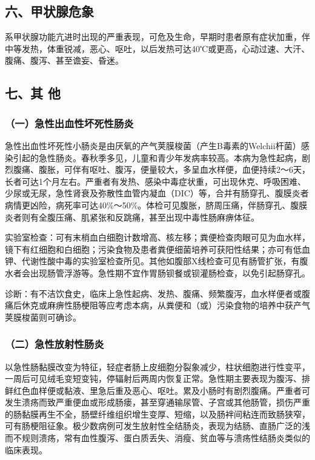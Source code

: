 \subsection{六、甲状腺危象}

系甲状腺功能亢进时出现的严重表现，可危及生命，早期时患者原有症状加重，伴中等发热，体重锐减，恶心、呕吐，以后发热可达40℃或更高，心动过速、大汗、腹痛、腹泻、甚至谵妄、昏迷。

\subsection{七、其 他}

\subsubsection{（一）急性出血性坏死性肠炎}

急性出血性坏死性小肠炎是由厌氧的产气荚膜梭菌（产生B毒素的Welchii杆菌）感染引起的急性肠炎。春秋季多见，儿童和青少年发病率较高。本病为急性起病，剧烈腹痛、腹胀，可伴有呕吐、腹泻，便量较大，多呈血水样便，血便持续2～6天，长者可达1个月左右。严重者有发热、感染中毒症状重，可出现休克、呼吸困难、少尿或无尿，急性肾衰及弥散性血管内凝血（DIC）等，合并有肠穿孔、腹膜炎者病情更凶险，病死率可达40\%～50\%。体检可见腹胀，脐周压痛，伴肠穿孔、腹膜炎者则有全腹压痛、肌紧张和反跳痛，甚至出现中毒性肠麻痹体征。

实验室检查：可有末梢血白细胞计数增高、核左移；粪便检查肉眼可见为血水样，镜下有红细胞和白细胞；污染食物及患者粪便细菌培养可获阳性结果；亦可有低血钾、代谢性酸中毒的实验室检查所见。其他如腹部X线检查可见有肠管扩张，有腹水者会出现肠管浮游等。急性期不宜作胃肠钡餐或钡灌肠检查，以免引起肠穿孔。

诊断：有不洁饮食史，临床上急性起病、发热、腹痛、频繁腹泻，血水样便者或腹痛后休克或麻痹性肠梗阻等应考虑本病，从粪便和（或）污染食物的培养中获产气荚膜梭菌则可确诊。

\subsubsection{（二）急性放射性肠炎}

以急性肠黏膜改变为特征，轻症者肠上皮细胞分裂象减少，柱状细胞进行性变平，一周后可见绒毛变短变钝，停辐射后两周内恢复正常。急性期主要表现为腹泻、排鲜红色血样便或黏液、里急后重及恶心、呕吐。累及小肠时有剧烈腹痛。严重者可发生溃疡而致严重便血或形成肠瘘，甚至穿通输尿管、子宫或其他肠管，损伤严重的肠黏膜再生不全，肠壁纤维组织增生变厚、短缩，以及肠袢间粘连而致肠狭窄，可有肠梗阻征象。极少数病例可发生放射性全结肠炎，表现为结肠、直肠广泛的浅而不规则溃疡，常有血性腹泻、蛋白质丢失、消瘦、贫血等与溃疡性结肠炎类似的临床表现。

